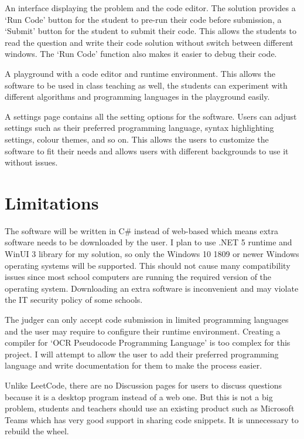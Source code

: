 \documentclass[a4paper]{report}
\begin{document}
An interface displaying the problem and the code editor. The solution provides a `Run Code' button for the student to pre-run their code before submission, a `Submit' button for the student to submit their code. This allows the students to read the question and write their code solution without switch between different windows. The `Run Code' function also makes it easier to debug their code.

A playground with a code editor and runtime environment. This allows the software to be used in class teaching as well, the students can experiment with different algorithms and programming languages in the playground easily.

A settings page contains all the setting options for the software. Users can adjust settings such as their preferred programming language, syntax highlighting settings, colour themes, and so on. This allows the users to customize the software to fit their needs and allows users with different backgrounds to use it without issues.

\section{Limitations}

The software will be written in C\# instead of web-based which means extra software needs to be downloaded by the user. I plan to use .NET 5 runtime and WinUI 3 library for my solution, so only the Windows 10 1809 or newer Windows operating systems will be supported. This should not cause many compatibility issues since most school computers are running the required version of the operating system. Downloading an extra software is inconvenient and may violate the IT security policy of some schools.

The judger can only accept code submission in limited programming languages and the user may require to configure their runtime environment. Creating a compiler for `OCR Pseudocode Programming Language' is too complex for this project. I will attempt to allow the user to add their preferred programming language and write documentation for them to make the process easier.

Unlike LeetCode, there are no Discussion pages for users to discuss questions because it is a desktop program instead of a web one. But this is not a big problem, students and teachers should use an existing product such as Microsoft Teams which has very good support in sharing code snippets. It is unnecessary to rebuild the wheel.
\end{document}
